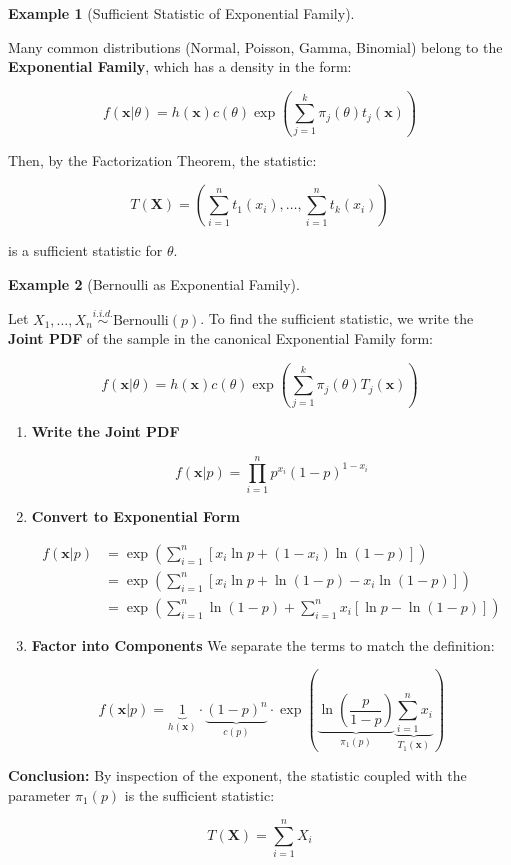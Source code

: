 \documentclass[
  letterpaper,
  DIV=11,
  numbers=noendperiod]{scrreprt}
\renewcommand{\[}{\begin{equation}}
\renewcommand{\]}{\end{equation}}
\theoremstyle{definition}
\theoremstyle{plain}
\theoremstyle{plain}
\theoremstyle{plain}
\theoremstyle{definition}
\newtheorem{example}{Example}[chapter]
\theoremstyle{plain}
\theoremstyle{remark}
\begin{document}
\begin{example}[Sufficient Statistic of Exponential
Family]\protect\hypertarget{exm-exp-family-sufficiency}{}\label{exm-exp-family-sufficiency}

Many common distributions (Normal, Poisson, Gamma, Binomial) belong to
the \textbf{Exponential Family}, which has a density in the form:

\[
f(\mathbf{x}|\theta) = h(\mathbf{x}) c(\theta) \exp\left( \sum_{j=1}^k \pi_j(\theta) t_j(\mathbf{x}) \right)
\]

Then, by the Factorization Theorem, the statistic:

\[
T(\mathbf{X}) = \left( \sum_{i=1}^n t_1(x_i), \dots, \sum_{i=1}^n t_k(x_i) \right)
\]

is a sufficient statistic for \(\theta\).

\end{example}

\begin{example}[Bernoulli as Exponential
Family]\protect\hypertarget{exm-bernoulli-expfamily}{}\label{exm-bernoulli-expfamily}

Let \(X_1, \dots, X_n \overset{i.i.d.}{\sim} \text{Bernoulli}(p)\). To
find the sufficient statistic, we write the \textbf{Joint PDF} of the
sample in the canonical Exponential Family form:

\[
f(\mathbf{x}|\theta) = h(\mathbf{x}) c(\theta) \exp\left( \sum_{j=1}^k \pi_j(\theta) T_j(\mathbf{x}) \right)
\]

\begin{enumerate}
\def\labelenumi{\arabic{enumi}.}
\item
  \textbf{Write the Joint PDF}

  \[
  f(\mathbf{x}|p) = \prod_{i=1}^n p^{x_i} (1-p)^{1-x_i}
  \]
\item
  \textbf{Convert to Exponential Form}

  \[
  \begin{aligned}
  f(\mathbf{x}|p) &= \exp\left( \sum_{i=1}^n \left[ x_i \ln p + (1-x_i) \ln(1-p) \right] \right) \\
  &= \exp\left( \sum_{i=1}^n \left[ x_i \ln p + \ln(1-p) - x_i \ln(1-p) \right] \right) \\
  &= \exp\left( \sum_{i=1}^n \ln(1-p) + \sum_{i=1}^n x_i \left[ \ln p - \ln(1-p) \right] \right)
  \end{aligned}
  \]
\item
  \textbf{Factor into Components} We separate the terms to match the
  definition:

  \[
  f(\mathbf{x}|p) = \underbrace{1}_{h(\mathbf{x})} \cdot \underbrace{(1-p)^n}_{c(p)} \cdot \exp\left( \underbrace{\ln\left(\frac{p}{1-p}\right)}_{\pi_1(p)} \underbrace{\sum_{i=1}^n x_i}_{T_1(\mathbf{x})} \right)
  \]
\end{enumerate}

\textbf{Conclusion:} By inspection of the exponent, the statistic
coupled with the parameter \(\pi_1(p)\) is the sufficient statistic:

\[
T(\mathbf{X}) = \sum_{i=1}^n X_i
\]

\end{example}
\end{document}

